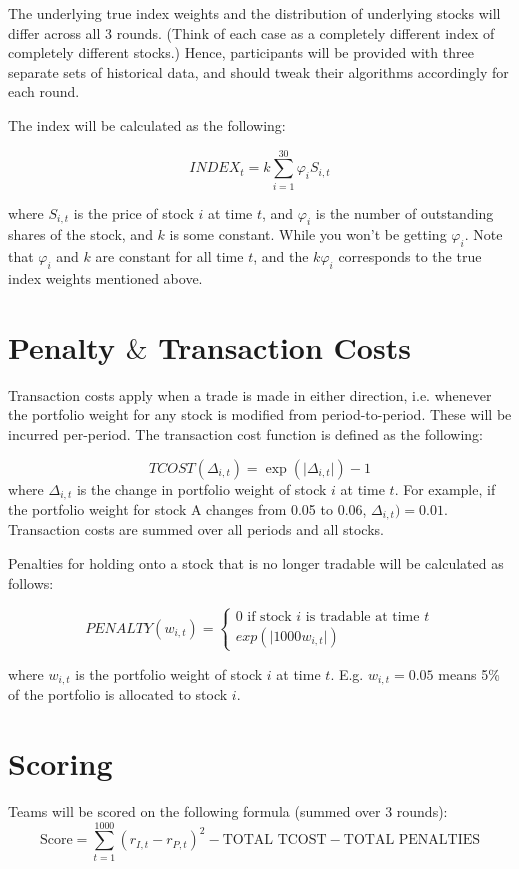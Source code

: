 \documentclass{amsart}
\renewcommand{\phi}{\varphi}
\providecommand{\abs}[1]{\lvert #1 \rvert}
\renewcommand{\_}[1]{\underline{ #1 }}
\theoremstyle{definition}
\numberwithin{equation}{subsection}
\begin{document}
The underlying true index weights and the distribution of underlying stocks will differ across all 3 rounds. (Think of each case as a completely different index of completely different stocks.) Hence, participants will be provided with three separate sets of historical data, and should tweak their algorithms accordingly for each round.

The index will be calculated as the following:

$$INDEX_t = k \sum\limits_{i=1}^{30} \phi_i S_{i,t}$$

where $S_{i,t}$ is the price of stock $i$ at time $t$, and $\phi_i$ is the number of outstanding shares of the stock, and $k$ is some constant. While you won't be getting $\phi_i$. Note that $\phi_i$ and $k$ are constant for all time $t$, and the $k\phi_i$ corresponds to the true index weights mentioned above. 

\section{Penalty $\&$ Transaction Costs}

Transaction costs apply when a trade is made in either direction, i.e. whenever the portfolio weight for any stock is modified from period-to-period. These will be incurred per-period. The transaction cost function is defined as the following:

$$TCOST(\Delta_{i,t}) = \exp\left(\abs{\Delta_{i,t}}\right) - 1$$
where $\Delta_{i,t}$ is the change in portfolio weight of stock $i$ at time $t$. For example, if the portfolio weight for stock A changes from 0.05 to 0.06, $\Delta_{i,t}) = 0.01$. Transaction costs are summed over all periods and all stocks. 

Penalties for holding onto a stock that is no longer tradable will be calculated as follows:

$$PENALTY(w_{i,t}) = \begin{cases}
0 \text{ if stock $i$ is tradable at time $t$}\\
exp(\abs{1000w_{i,t}})
\end{cases}$$

where $w_{i,t}$ is the portfolio weight of stock $i$ at time $t$. E.g. $w_{i,t} = 0.05$ means 5\% of the portfolio is allocated to stock $i$.

\section{Scoring}
Teams will be scored on the following formula (summed over 3 rounds):
$$\text{Score} = \sum_{t=1}^{1000} (r_{I,t} - r_{P,t})^2 - \text{TOTAL TCOST} - \text{TOTAL PENALTIES}$$
\end{document}
